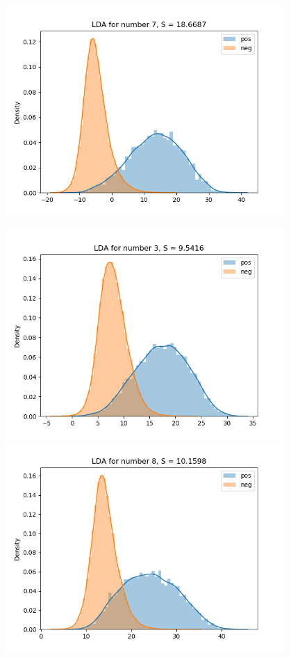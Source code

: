 \documentclass{article}
\begin{document}
\begin{figure}[H]
\begin{minipage}{0.19\textwidth}
        \includegraphics[width=0.95\textwidth]{fig/lda/7.png}
    \end{minipage}
    \begin{minipage}{0.19\textwidth}
        \centering
        \includegraphics[width=0.95\textwidth]{fig/lda/3.png}
        \includegraphics[width=0.95\textwidth]{fig/lda/8.png}

\end{minipage}
\end{figure}
\end{document}
